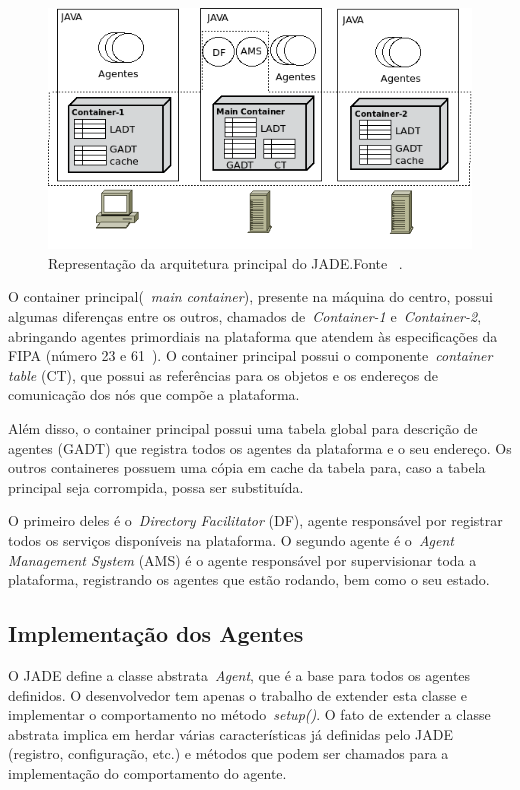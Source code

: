 \begin{figure}
	\centering
	\includegraphics[scale=0.65]{images/arquitetura-jade.png}
	\caption{Representação da arquitetura principal do JADE.Fonte ~\cite{bellifemine07}.}
	\label{fig:arquitetura-jade}
\end{figure}

O container principal(~\emph{main container}), presente na máquina do centro, possui algumas diferenças entre os outros, chamados de~\emph{Container-1} e~\emph{Container-2}, abringando agentes primordiais na plataforma que atendem às especificações da FIPA (número 23 e 61~\cite{bellifemineGuide02}). O container principal possui o componente~\emph{container table} (CT), que possui as referências para os objetos e os endereços de comunicação dos nós que compõe a plataforma.

Além disso, o container principal possui uma tabela global para descrição de agentes (GADT) que registra todos os agentes da plataforma e o seu endereço. Os outros containeres possuem uma cópia em cache da tabela para, caso a tabela principal seja corrompida, possa ser substituída.

O primeiro deles é o~\emph{Directory Facilitator} (DF), agente responsável por registrar todos os serviços disponíveis na plataforma. O segundo agente é o~\emph{Agent Management System} (AMS) é o agente responsável por supervisionar toda a plataforma, registrando os agentes que estão rodando, bem como o seu estado. 

\subsection{Implementação dos Agentes}
O JADE define a classe abstrata~\emph{Agent}, que é a base para todos os agentes definidos. O desenvolvedor tem apenas o trabalho de extender esta classe e implementar o comportamento no método~\emph{setup()}. O fato de extender a classe abstrata implica em herdar várias características já definidas pelo JADE (registro, configuração, etc.) e métodos que podem ser chamados para a implementação do comportamento do agente.

